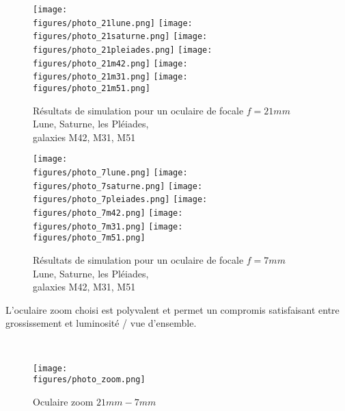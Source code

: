 \begin{figure}[H]
    \centering
    \texttt{[image: \\figures/photo\_21lune.png]}
    \texttt{[image: \\figures/photo\_21saturne.png]}
    \texttt{[image: \\figures/photo\_21pleiades.png]}
    \texttt{[image: \\figures/photo\_21m42.png]}
    \texttt{[image: \\figures/photo\_21m31.png]}
    \texttt{[image: \\figures/photo\_21m51.png]}
    \decoRule
    \caption[
	Résultats de simulation pour un oculaire de focale $f=21mm$\\Lune, Saturne, les Pléiades,\\galaxies M42, M31, M51]{
	Résultats de simulation pour un oculaire de focale $f=21mm$\\Lune, Saturne, les Pléiades,\\galaxies M42, M31, M51}
    \label{fig:	Résultats de simulation pour un oculaire de focale $f=21mm$ Lune, Saturne, les Pléiades, galaxies M42, M31, M51}
    \end{figure}

\begin{figure}[H]
    \centering
    \texttt{[image: \\figures/photo\_7lune.png]}
    \texttt{[image: \\figures/photo\_7saturne.png]}
    \texttt{[image: \\figures/photo\_7pleiades.png]}
    \texttt{[image: \\figures/photo\_7m42.png]}
    \texttt{[image: \\figures/photo\_7m31.png]}
    \texttt{[image: \\figures/photo\_7m51.png]}
    \decoRule
    \caption[
	Résultats de simulation pour un oculaire de focale $f=7mm$\\Lune, Saturne, les Pléiades,\\galaxies M42, M31, M51]{
	Résultats de simulation pour un oculaire de focale $f=7mm$\\Lune, Saturne, les Pléiades,\\galaxies M42, M31, M51}
    \label{fig:	Résultats de simulation pour un oculaire de focale $f=7mm$ Lune, Saturne, les Pléiades, galaxies M42, M31, M51}
    \end{figure}

\vspace{1cm}


L'oculaire zoom choisi est polyvalent et permet un compromis satisfaisant entre grossissement et luminosité / vue d'ensemble.

{\href{https://www.astroshop.de/fr/oculaires/omegon-7-21mm-super-ploessl-oculaire-zoom-apo-1-25-/p,5084}{\\}}

\begin{figure}[H]
    \centering
    \texttt{[image: \\figures/photo\_zoom.png]}
    \decoRule
    \caption[
    Oculaire zoom $21mm-7mm$]{
    Oculaire zoom $21mm-7mm$}
    \label{fig:Oculaire zoom $21mm-7mm$}
    \end{figure}

